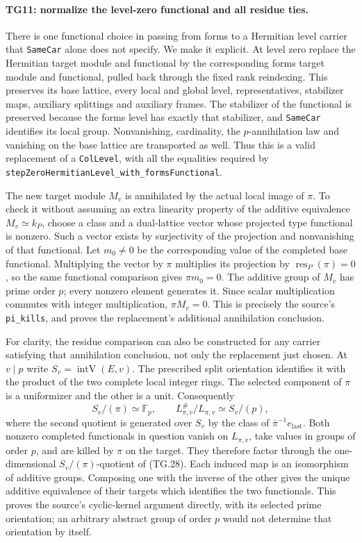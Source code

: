 \paragraph{TG11: normalize the level-zero functional and all residue ties.}
There is one functional choice in passing from forms to a
Hermitian level carrier that \texttt{SameCar} alone does not
specify. We make it explicit. At level zero replace the
Hermitian target module and functional by the corresponding
forms target module and functional, pulled back through the
fixed rank reindexing. This preserves its base lattice, every
local and global level, representatives, stabilizer maps,
auxiliary splittings and auxiliary frames. The stabilizer of
the functional is preserved because the forms level has
exactly that stabilizer, and \texttt{SameCar} identifies its
local group. Nonvanishing, cardinality, the $p$-annihilation
law and vanishing on the base lattice are transported as well.
Thus this is a valid replacement of a \texttt{ColLevel},
with all the equalities required by
\texttt{stepZeroHermitianLevel\_with\_formsFunctional}.

The new target module $M_v$ is annihilated by the actual
local image of $\pi$. To check it without assuming an extra
linearity property of the additive equivalence $M_v\simeq k_P$,
choose a class and a dual-lattice vector whose projected type
functional is nonzero. Such a vector exists by surjectivity of
the projection and nonvanishing of that functional. Let
$m_0\ne0$ be the corresponding value of the completed base
functional. Multiplying the vector by $\pi$ multiplies its
projection by $\operatorname{res}_P(\pi)=0$, so the same
functional comparison gives $\pi m_0=0$. The additive group
of $M_v$ has prime order $p$; every nonzero element generates
it. Since scalar multiplication commutes with integer
multiplication, $\pi M_v=0$. This is precisely the source's
\texttt{pi\_kills}, and proves the replacement's additional
annihilation conclusion.

For clarity, the residue comparison can also be constructed for
any carrier satisfying that annihilation conclusion, not only
the replacement just chosen. At $v\mid p$ write
$S_v=\operatorname{intV}(E,v)$. The prescribed split orientation
identifies it with the product of the two complete local integer
rings. The selected component of $\pi$ is a uniformizer and
the other is a unit. Consequently
\[
 S_v/(\pi)\simeq\mathbb F_p,\qquad
 L_{\pi,v}^{\#}/L_{\pi,v}\simeq S_v/(p),
 \tag{TG.28}
\]
where the second quotient is generated over $S_v$ by the
class of $\bar\pi^{-1}e_{\mathrm{last}}$. Both nonzero completed
functionals in question vanish on $L_{\pi,v}$, take values
in groups of order $p$, and are killed by $\pi$ on the target.
They therefore factor through the one-dimensional
$S_v/(\pi)$-quotient of (TG.28). Each induced map is an
isomorphism of additive groups. Composing one with the inverse
of the other gives the unique additive equivalence of their
targets which identifies the two functionals. This proves the
source's cyclic-kernel argument directly, with its selected
prime orientation; an arbitrary abstract group of order $p$
would not determine that orientation by itself.

